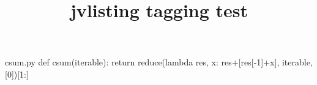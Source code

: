 \begin{filecontents}[noheader]{csum.py}
def csum(iterable):
return reduce(lambda res, x: res+[res[-1]+x], iterable, [0])[1:]
\end{filecontents}
\documentclass{article}
\usepackage{jvlisting}

\title{jvlisting tagging test}


Some text
\begin{listing}
def csum(iterable):
return reduce(lambda res, x: res+[res[-1]+x], iterable, [0])[1:]
\end{listing}
more text
\begin{figure}[h]
\begin{listing}
def csum(iterable):
return reduce(lambda res, x: res+[res[-1]+x], iterable, [0])[1:]
\end{listing}
\caption{Some listing}
\end{figure}
Compare with:
\begin{verbatim}
def csum(iterable):
return reduce(lambda res, x: res+[res[-1]+x], iterable, [0])[1:]
\end{verbatim}

